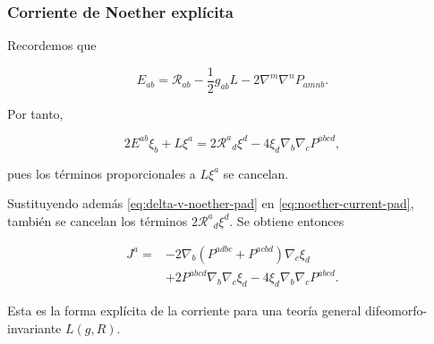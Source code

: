\documentclass{beamer}
\newcommand{\Rcal}{\mathcal{R}}
\newcommand{\Eq}[1]{\eqref{#1}}
\begin{document}
\begin{frame}[label=nav-frame-044]
	\frametitle{Corriente de Noether explícita}
	\small

	Recordemos que

	\[
	E_{ab}
	=
	\Rcal_{ab}
	-\frac12g_{ab}L
	-2\nabla^m\nabla^nP_{amnb}.
	\]


	Por tanto,

	\[
	2E^{ab}\xi_b+L\xi^a
	=
	2\Rcal^a{}_d\xi^d
	-
	4\xi_d\nabla_b\nabla_cP^{abcd},
	\]

	pues los términos proporcionales a \(L\xi^a\) se cancelan.


	Sustituyendo además \Eq{eq:delta-v-noether-pad} en
	\Eq{eq:noether-current-pad}, también se cancelan los
	términos \(2\Rcal^a{}_d\xi^d\). Se obtiene entonces

	\begin{equation}
		\boxed{
			\begin{aligned}
				J^a
				={}&
				-2\nabla_b
				\left(
				P^{adbc}+P^{acbd}
				\right)\nabla_c\xi_d
				\\
				&+
				2P^{abcd}\nabla_b\nabla_c\xi_d
				-
				4\xi_d\nabla_b\nabla_cP^{abcd}.
			\end{aligned}
		}
		\label{eq:noether-current-explicit-pad}
	\end{equation}

	Esta es la forma explícita de la corriente para una teoría
	general difeomorfo-invariante \(L(g,R)\).

\end{frame}
\end{document}
